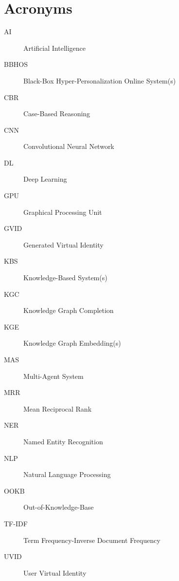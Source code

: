 

\chapter{Acronyms}
\begin{description}
\item[AI]{Artificial Intelligence}
\item[BBHOS]{Black-Box Hyper-Personalization Online System(s)}
\item[CBR]{Case-Based Reasoning}
\item[CNN]{Convolutional Neural Network}
\item[DL]{Deep Learning}
\item[GPU]{Graphical Processing Unit}
\item[GVID]{Generated Virtual Identity}
\item[KBS]{Knowledge-Based System(s)}
\item[KGC]{Knowledge Graph Completion}
\item[KGE]{Knowledge Graph Embedding(s)}
\item[MAS]{Multi-Agent System}
\item[MRR]{Mean Reciprocal Rank}
\item[NER]{Named Entity Recognition}
\item[NLP]{Natural Language Processing}
\item[OOKB]{Out-of-Knowledge-Base}
\item[TF-IDF]{Term Frequency-Inverse Document Frequency}
\item[UVID]{User Virtual Identity}

\end{description}




